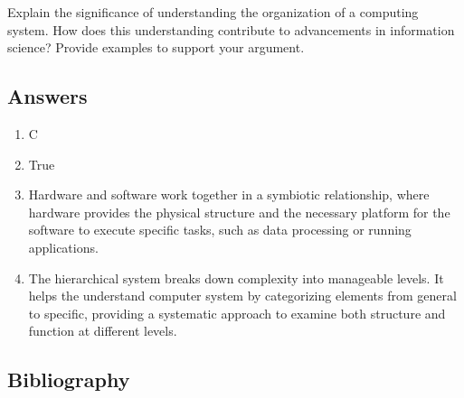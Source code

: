 \documentclass[
  letterpaper,
  DIV=11,
  numbers=noendperiod]{scrreprt}
\providecommand{\tightlist}{%
  \setlength{\itemsep}{0pt}\setlength{\parskip}{0pt}}\usepackage{longtable,booktabs,array}
\begin{document}
\begin{tcolorbox}[enhanced jigsaw, colframe=quarto-callout-tip-color-frame, opacityback=0, breakable, arc=.35mm, leftrule=.75mm, coltitle=black, toptitle=1mm, bottomtitle=1mm, left=2mm, colbacktitle=quarto-callout-tip-color!10!white, titlerule=0mm, colback=white, title=\textcolor{quarto-callout-tip-color}{\faLightbulb}\hspace{0.5em}{Critical Question}, toprule=.15mm, bottomrule=.15mm, rightrule=.15mm, opacitybacktitle=0.6]

Explain the significance of understanding the organization of a
computing system. How does this understanding contribute to advancements
in information science? Provide examples to support your argument.

\end{tcolorbox}

\subsection{Answers}\label{answers}

\begin{enumerate}
\def\labelenumi{\arabic{enumi}.}
\tightlist
\item
  C
\item
  True
\item
  Hardware and software work together in a symbiotic relationship, where
  hardware provides the physical structure and the necessary platform
  for the software to execute specific tasks, such as data processing or
  running applications.
\item
  The hierarchical system breaks down complexity into manageable levels.
  It helps the understand computer system by categorizing elements from
  general to specific, providing a systematic approach to examine both
  structure and function at different levels.
\end{enumerate}

\subsection{Bibliography}\label{bibliography}
\end{document}
